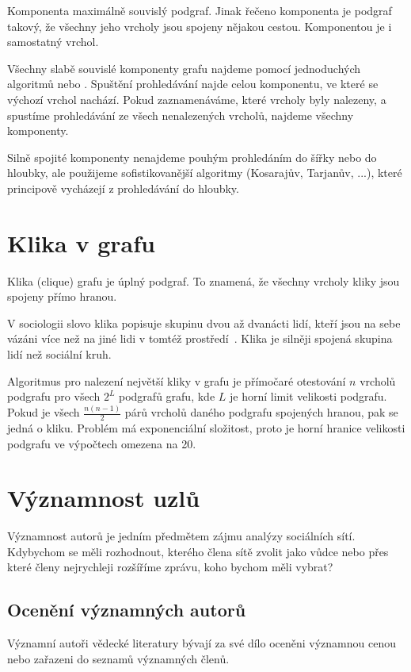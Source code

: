 \documentclass{bakalarka}
\begin{document}
Komponenta maximálně souvislý podgraf. Jinak řečeno komponenta je podgraf
takový, že všechny jeho vrcholy jsou spojeny nějakou cestou. Komponentou je i
samostatný vrchol.

Všechny slabě souvislé komponenty grafu najdeme pomocí jednoduchých algoritmů
 nebo . Spuštění prohledávání najde
celou komponentu, ve které se výchozí vrchol nachází. Pokud zaznamenáváme,
které vrcholy byly nalezeny, a spustíme prohledávání ze všech nenalezených
vrcholů, najdeme všechny komponenty. 

Silně spojité komponenty nenajdeme pouhým prohledáním do šířky nebo do hloubky,
ale použijeme sofistikovanější algoritmy (Kosarajův, Tarjanův, ...), které
principově vycházejí z prohledávání do hloubky.

\section{Klika v grafu}
Klika (clique) grafu je úplný podgraf. To znamená, že všechny vrcholy kliky
jsou spojeny přímo hranou.

V sociologii slovo klika popisuje skupinu dvou až dvanácti lidí, kteří jsou na
sebe vázáni více než na jiné lidi v tomtéž prostředí~\citep{salkind2008}. Klika
je silněji spojená skupina lidí než sociální kruh.

Algoritmus pro nalezení největší kliky v grafu je přímočaré otestování $n$
vrcholů podgrafu pro všech $2^L$ podgrafů grafu, kde $L$ je horní limit
velikosti podgrafu. Pokud je všech $\frac{n(n - 1)}{2}$ párů vrcholů daného
podgrafu spojených hranou, pak se jedná o kliku. Problém má exponenciální
složitost, proto je horní hranice velikosti podgrafu ve výpočtech omezena na
20.

\section{Významnost uzlů}
Významnost autorů je jedním předmětem zájmu analýzy sociálních sítí. Kdybychom
se měli rozhodnout, kterého člena sítě zvolit jako vůdce nebo přes které členy
nejrychleji rozšíříme zprávu, koho bychom měli vybrat? 

\subsection{Ocenění významných autorů}
Významní autoři vědecké literatury bývají za své dílo oceněni významnou cenou
nebo zařazeni do seznamů významných členů.
\end{document}
